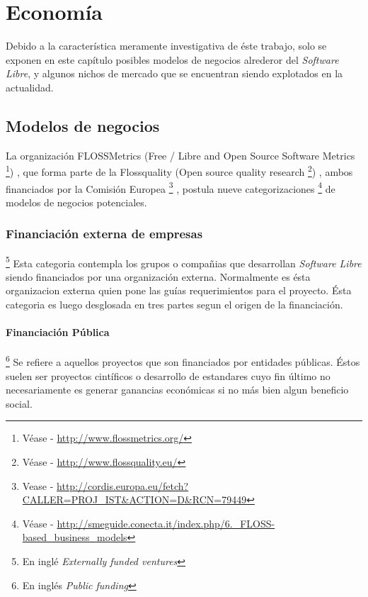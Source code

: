 \chapter{Econom\'ia}
%
%
Debido a la caracter\'istica meramente investigativa de \'este trabajo, solo
se exponen en este cap\'itulo posibles modelos de negocios alrederor del
\emph{Software Libre}, y algunos nichos de mercado que se encuentran siendo
explotados en la actualidad.\\

\section{Modelos de negocios}
La organizaci\'on FLOSSMetrics 
(Free / Libre and Open Source Software Metrics
\footnote{V\'ease - \url{http://www.flossmetrics.org/}})
, que forma parte de la Flossquality (Open source quality research
\footnote{V\'ease - \url{http://www.flossquality.eu/}})
, ambos financiados por la Comisi\'on Europea
\footnote{Vease -
\url{http://cordis.europa.eu/fetch?CALLER=PROJ_IST&ACTION=D&RCN=79449}}
, postula nueve categorizaciones
\footnote{V\'ease -
\url{http://smeguide.conecta.it/index.php/6._FLOSS-based_business_models}} 
de modelos de negocios potenciales.


\subsection{Financiaci\'on externa de empresas}\footnote{En ingl\'e
\emph{Externally funded ventures}}
%
Esta categoria contempla los grupos o compa\~nias que desarrollan
\emph{Software Libre} siendo financiados por una organizaci\'on externa.
Normalmente es \'esta organizacion externa quien pone las gu\'ias
requerimientos para el proyecto. \'Esta categoria es luego desglosada en tres
partes segun el origen de la financiaci\'on.

\subsubsection{Financiaci\'on P\'ublica}\footnote{En ingl\'es \emph{Public
funding}}
%
Se refiere a aquellos proyectos que son financiados por entidades p\'ublicas.
\'Estos suelen ser proyectos cint\'ificos o desarrollo de estandares cuyo fin
\'ultimo no necesariamente es generar ganancias econ\'omicas si no m\'as bien
algun beneficio social.

